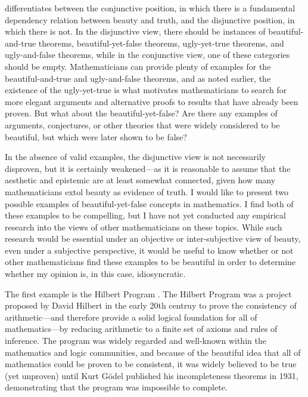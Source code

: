 \documentclass[a4paper,man,natbib]{apa6}
\begin{document}
\cite{todd_unmasking_2008} differentiates between the conjunctive position, in which there is a fundamental dependency
relation between beauty and truth, and the disjunctive position, in which there is not. 
In the disjunctive view, there should be 
instances of beautiful-and-true theorems, beautiful-yet-false theorems, ugly-yet-true theorems, and ugly-and-false theorems,
while in the conjunctive view, one of these categories should be empty. 
Mathematicians can provide plenty of examples for the beautiful-and-true \citep{aigner1999proofs} and
ugly-and-false theorems, and as noted earlier, the existence of the ugly-yet-true is what motivates mathematicians
to search for more elegant arguments and alternative proofs to results that have already been proven. But what about
the beautiful-yet-false? Are there any examples of arguments, conjectures, or other theories that were widely considered 
to be beautiful, but which were later shown to be false?

In the absence of valid examples, the disjunctive view is not necessarily disproven, but it is certainly weakened---as
it is reasonable to assume that the aesthetic and epistemic are at least somewhat connected, given how many 
mathematicians extol beauty as evidence of truth. I would like to present two possible examples of beautiful-yet-false
concepts in mathematics.
I find both of these examples to be compelling, but I have not yet conducted any empirical research into the views
of other mathematicians on these topics. While such research would be essential under an objective or inter-subjective
view of beauty, even under a subjective perspective, it would be useful to know whether or not other mathematicians
find these examples to be beautiful in order to determine whether my opinion is, in this case, idiosyncratic.

The first example is the Hilbert Program \citep{sep-hilbert-program}. The Hilbert Program was a project proposed by 
David Hilbert in the early 20th centruy to prove the consistency of arithmetic---and therefore provide a solid 
logical foundation for all of mathematics---by reducing 
arithmetic to a finite set of axioms and rules of inference. The program was widely regarded and well-known within
the mathematics and logic communities, and because of the beautiful idea that all of mathematics could be proven
to be consistent, it was widely believed to be true (yet unproven) until Kurt Gödel published his incompleteness
theorems in 1931, demonstrating that the program was impossible to complete.
\end{document}
